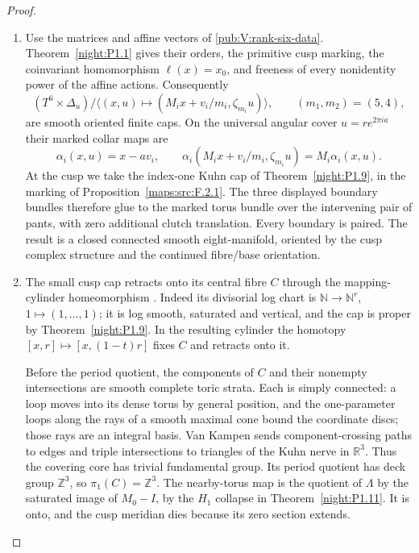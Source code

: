 \begin{proof}
\begin{enumerate}[label={$\langle1\rangle$\arabic*.}]
\item Use the matrices and affine vectors of \cref{pub:V:rank-six-data}.
Theorem~\ref{night:P1.1} gives their orders, the primitive cusp
marking, the coinvariant homomorphism $\ell(x)=x_0$, and freeness of
every nonidentity power of the affine actions. Consequently
\[
 (T^6\times\Delta_u)/
 \langle(x,u)\mapsto(M_ix+v_i/m_i,\zeta_{m_i}u)\rangle,
 \qquad (m_1,m_2)=(5,4),
\]
are smooth oriented finite caps. On the universal angular cover
$u=r e^{2\pi ia}$ their marked collar maps are
\[
 \alpha_i(x,u)=x-av_i,
 \qquad
 \alpha_i(M_ix+v_i/m_i,\zeta_{m_i}u)=M_i\alpha_i(x,u).
\]
At the cusp we take the index-one Kuhn cap of
Theorem~\ref{night:P1.9}, in the marking of
Proposition~\ref{maps:src:F.2.1}. The three displayed boundary bundles
therefore glue to the marked torus bundle over the intervening pair
of pants, with zero additional clutch translation. Every boundary
is paired. The result is a closed connected smooth eight-manifold,
oriented by the cusp complex structure and the continued fibre/base
orientation.

\item The small cusp cap retracts onto its central fibre $C$ through
the mapping-cylinder homeomorphism
\cite[Theorem 4.1.1 and Lemmas 4.1.2--4.1.3, pp.~480--482]{ffAchingerOgus20}.
Indeed its divisorial log chart is
$\mathbb N\to\mathbb N^r$, $1\mapsto(1,\ldots,1)$; it is log smooth,
saturated and vertical, and the cap is proper by
Theorem~\ref{night:P1.9}. In the resulting cylinder the homotopy
$[x,r]\mapsto[x,(1-t)r]$ fixes $C$ and retracts onto it.

Before the period quotient, the components of $C$ and their
nonempty intersections are smooth complete toric strata. Each is
simply connected: a loop moves into its dense torus by general
position, and the one-parameter loops along the rays of a smooth
maximal cone bound the coordinate discs; those rays are an integral
basis. Van Kampen sends component-crossing paths to edges and triple
intersections to triangles of the Kuhn nerve in $\mathbb R^3$.
Thus the covering core has trivial fundamental group. Its period
quotient has deck group $\mathbb Z^3$, so $\pi_1(C)=\mathbb Z^3$.
The nearby-torus map is the quotient of $\Lambda$ by the saturated
image of $M_0-I$, by the $H_1$ collapse in
Theorem~\ref{night:P1.11}. It is onto, and the cusp meridian dies
because its zero section extends.


\end{enumerate}
\end{proof}
